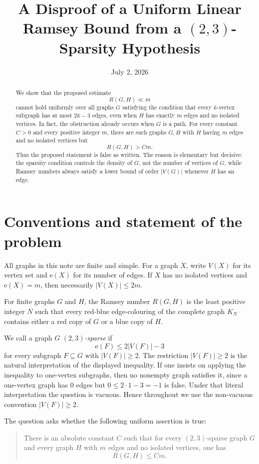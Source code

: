 \documentclass[11pt]{amsart}
\title[A disproof of a uniform linear Ramsey bound]{A Disproof of a Uniform Linear Ramsey Bound from a \texorpdfstring{$(2,3)$}{(2,3)}-Sparsity Hypothesis}
\author{}
\date{July 2, 2026}
\theoremstyle{remark}
\newcommand{\edg}{\mathrm e}
\begin{document}
\begin{abstract}
We show that the proposed estimate
\[
        R(G,H) \ll m
\]
cannot hold uniformly over all graphs $G$ satisfying the condition that every $k$-vertex subgraph has at most $2k-3$ edges, even when $H$ has exactly $m$ edges and no isolated vertices.  In fact, the obstruction already occurs when $G$ is a path.  For every constant $C>0$ and every positive integer $m$, there are such graphs $G,H$ with $H$ having $m$ edges and no isolated vertices but
\[
        R(G,H)>Cm.
\]
Thus the proposed statement is false as written.  The reason is elementary but decisive: the sparsity condition controls the density of $G$, not the number of vertices of $G$, while Ramsey numbers always satisfy a lower bound of order $|V(G)|$ whenever $H$ has an edge.
\end{abstract}

\maketitle

\section{Conventions and statement of the problem}

All graphs in this note are finite and simple.  For a graph $X$, write $V(X)$ for its vertex set and $\edg(X)$ for its number of edges.  If $X$ has no isolated vertices and $\edg(X)=m$, then necessarily $|V(X)|\le 2m$.

For finite graphs $G$ and $H$, the Ramsey number $R(G,H)$ is the least positive integer $N$ such that every red-blue edge-colouring of the complete graph $K_N$ contains either a red copy of $G$ or a blue copy of $H$.

We call a graph $G$ \emph{$(2,3)$-sparse} if
\[
        \edg(F)\le 2|V(F)|-3
\]
for every subgraph $F\subseteq G$ with $|V(F)|\ge 2$.  The restriction $|V(F)|\ge 2$ is the natural interpretation of the displayed inequality.  If one insists on applying the inequality to one-vertex subgraphs, then no nonempty graph satisfies it, since a one-vertex graph has $0$ edges but $0\le 2\cdot 1-3=-1$ is false.  Under that literal interpretation the question is vacuous.  Hence throughout we use the non-vacuous convention $|V(F)|\ge 2$.

The question asks whether the following uniform assertion is true:

\begin{quote}
There is an absolute constant $C$ such that for every $(2,3)$-sparse graph $G$ and every graph $H$ with $m$ edges and no isolated vertices, one has
\[
        R(G,H)\le Cm.
\]
\end{quote}
\end{document}
